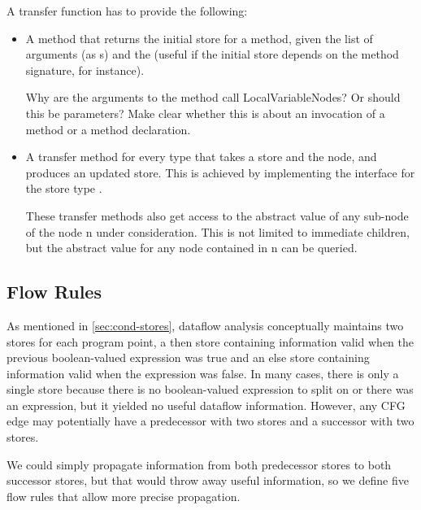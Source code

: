 A transfer function has to provide the following:
\begin{itemize}
\item A method that returns the initial store for a method, given the
  list of arguments (as s) and the
   (useful if the initial store depends on the method
  signature, for instance).

  \begin{workinprogress}
    Why are the arguments to the method call LocalVariableNodes? Or
    should this be parameters? Make clear whether this is about an
    invocation of a method or a method declaration.
  \end{workinprogress}

\item A transfer method for every  type that takes a store
  and the node, and produces an updated store. This is achieved by
  implementing the  interface for the store
  type .

These transfer methods also get access to the abstract value of any
sub-node of the node \code n under consideration.  This is not limited
to immediate children, but the abstract value for any node contained
in \code n can be queried.

\end{itemize}


\subsection{Flow Rules}
\label{sec:flow-rules}

As mentioned in \autoref{sec:cond-stores}, dataflow analysis
conceptually maintains two stores for each program point, a then store
containing information valid when the previous boolean-valued
expression was true and an else store containing information valid
when the expression was false.  In many cases, there is only a single
store because there is no boolean-valued expression to split on or
there was an expression, but it yielded no useful dataflow
information.  However, any CFG edge may potentially have a predecessor
with two stores and a successor with two stores.

We could simply propagate information from both predecessor stores to
both successor stores, but that would throw away useful information,
so we define five flow rules that allow more precise propagation.

